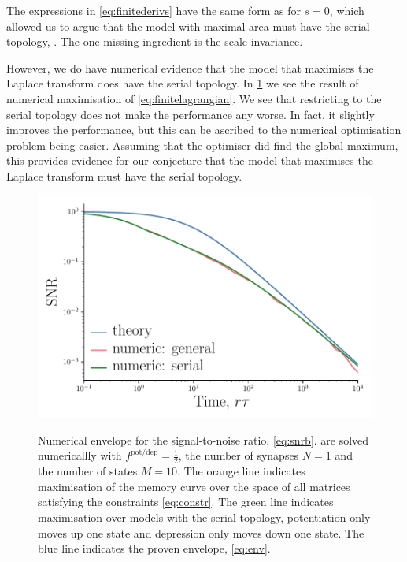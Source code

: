 \documentclass[12pt]{article}
\newcommand{\potdep}{^{\text{pot/dep}}}
\begin{document}
The expressions in \cref{eq:finitederivs} have the same form as for $s=0$, which allowed us to argue that the model with maximal area must have the serial topology, \cite{Lahiri2013synapse}.
The one missing ingredient is the scale invariance.

However, we do have numerical evidence that the model that maximises the Laplace transform does have the serial topology.
In \cref{fig:envnum} we see the result of numerical maximisation of \cref{eq:finitelagrangian}.
We see that restricting to the serial topology does not make the performance any worse.
In fact, it slightly improves the performance, but this can be ascribed to the numerical optimisation problem being easier.
Assuming that the optimiser did find the global maximum, this provides evidence for our conjecture that the model that maximises the Laplace transform must have the serial topology.


\begin{figure}[tb]
  \centering
  \includegraphics[width=0.8\linewidth]{LenvNum.pdf}\\
  \caption[Numerical envelope for the signal-to-noise ratio]
  {Numerical envelope for the signal-to-noise ratio, \eqref{eq:snrb}. 
   are solved numericallly with $f\potdep=\frac{1}{2}$, the number of synapses $N=1$ and the number of states $M=10$.
  The orange line indicates maximisation of the memory curve over the space of all matrices satisfying the constraints \eqref{eq:constr}.
  The green line indicates maximisation over models with the serial topology, \ie potentiation only moves up one state and depression only moves down one state.
  The blue line indicates the proven envelope, \eqref{eq:env}.}\label{fig:envnum}
\end{figure}
\end{document}
